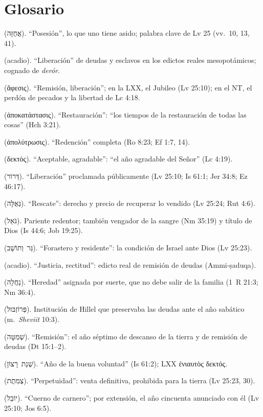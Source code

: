 \documentclass[11pt,letterpaper]{article}
\newcommand{\heb}[1]{\mbox{\foreignlanguage{hebrew}{#1}}}
\newcommand{\grc}[1]{\foreignlanguage{ancientgreek}{#1}}
\begin{document}
\section*{Glosario}
\begin{description}\setlength{\itemsep}{2pt}
\item[\emph{Ajuzá}] (\heb{אֲחֻזָּה}). ``Posesión'', lo que uno tiene asido; palabra clave de Lv 25 (vv.~10, 13, 41).
\item[\emph{Andurārum}] (acadio). ``Liberación'' de deudas y esclavos en los edictos reales mesopotámicos; cognado de \emph{derór}.
\item[\emph{Áphesis}] (\grc{ἄφεσις}). ``Remisión, liberación''; en la LXX, el Jubileo (Lv 25:10); en el NT, el perdón de pecados y la libertad de Lc 4:18.
\item[\emph{Apokatástasis}] (\grc{ἀποκατάστασις}). ``Restauración'': ``los tiempos de la restauración de todas las cosas'' (Hch 3:21).
\item[\emph{Apolytrōsis}] (\grc{ἀπολύτρωσις}). ``Redención'' completa (Ro 8:23; Ef 1:7, 14).
\item[\emph{Dektós}] (\grc{δεκτός}). ``Aceptable, agradable'': ``el año agradable del Señor'' (Lc 4:19).
\item[\emph{Derór}] (\heb{דְּרוֹר}). ``Liberación'' proclamada públicamente (Lv 25:10; Is 61:1; Jer 34:8; Ez 46:17).
\item[\emph{Ge'ulá}] (\heb{גְּאֻלָּה}). ``Rescate'': derecho y precio de recuperar lo vendido (Lv 25:24; Rut 4:6).
\item[\emph{Goel}] (\heb{גֹּאֵל}). Pariente redentor; también vengador de la sangre (Nm 35:19) y título de Dios (Is 44:6; Job 19:25).
\item[\emph{Guer ve-toshav}] (\heb{גֵּר וְתוֹשָׁב}). ``Forastero y residente'': la condición de Israel ante Dios (Lv 25:23).
\item[\emph{Mīšarum}] (acadio). ``Justicia, rectitud'': edicto real de remisión de deudas (Ammi-ṣaduqa).
\item[\emph{Najalá}] (\heb{נַחֲלָה}). ``Heredad'' asignada por suerte, que no debe salir de la familia (1~R 21:3; Nm 36:4).
\item[\emph{Prozbul}] (\heb{פְּרוֹזְבּוּל}). Institución de Hillel que preservaba las deudas ante el año sabático (m.~\emph{Sheviit} 10:3).
\item[\emph{Shemitá}] (\heb{שְׁמִטָּה}). ``Remisión'': el año séptimo de descanso de la tierra y de remisión de deudas (Dt 15:1--2).
\item[\emph{Shenat ratsón}] (\heb{שְׁנַת רָצוֹן}). ``Año de la buena voluntad'' (Is 61:2); LXX \grc{ἐνιαυτὸς δεκτός}.
\item[\emph{Tsemitut}] (\heb{צְמִתֻת}). ``Perpetuidad'': venta definitiva, prohibida para la tierra (Lv 25:23, 30).
\item[\emph{Yovel}] (\heb{יוֹבֵל}). ``Cuerno de carnero''; por extensión, el año cincuenta anunciado con él (Lv 25:10; Jos 6:5).
\end{description}
\end{document}
